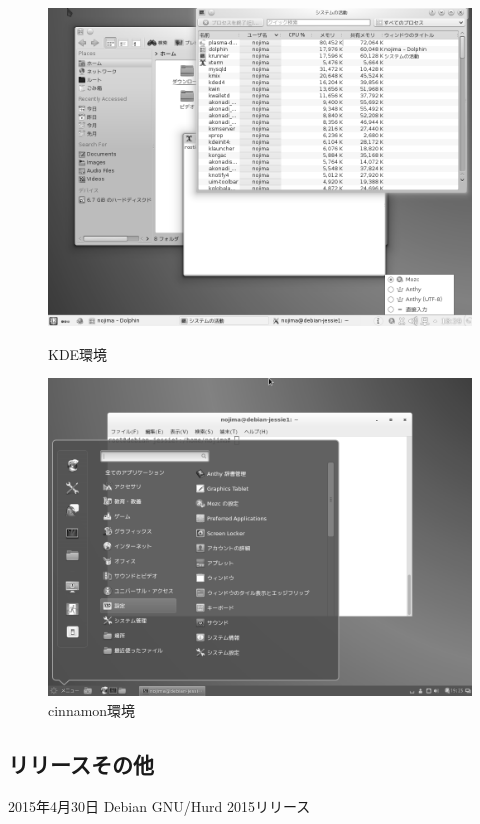 \documentclass[mingoth,a4paper]{jsarticle}
\begin{document}
\begin{figure}[htbp]
 \begin{minipage}{0.5\hsize}
  \begin{center}
   \includegraphics[width=0.8\hsize]{image201509/debian8-kde_mono.png}
   \caption{KDE環境}
  \end{center}
 \end{minipage}
 \begin{minipage}{0.5\hsize}
  \begin{center}
  \includegraphics[width=0.8\hsize]{image201509/debian8-cinnamon_mono.png}
  \caption{cinnamon環境}
  \end{center}
 \end{minipage}
\end{figure}

\clearpage

\subsection{リリースその他}
  \begin{center}
    \Large
2015年4月30日 Debian GNU/Hurd 2015リリース
  \end{center}
\end{document}
